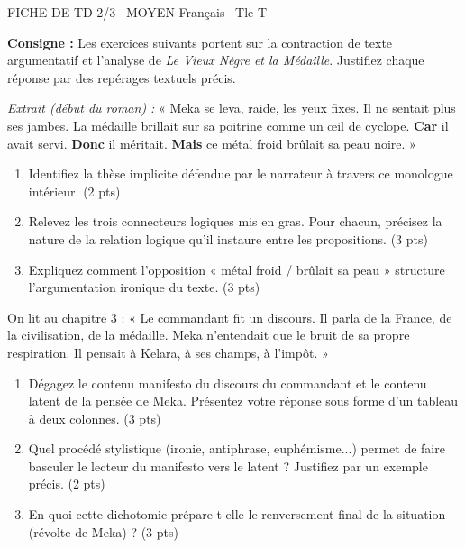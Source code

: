 \documentclass[11pt]{article}
\begin{document}
\begin{tcolorbox}[enhanced,colback=popink,colframe=popink,arc=10pt,boxrule=0pt,left=12pt,right=12pt,top=9pt,bottom=9pt]
{\color{white}\popxbold\small FICHE DE TD 2/3 \textbullet\ MOYEN \hfill Français \textbullet\ Tle T\par}
\end{tcolorbox}
\vspace{4pt}
\textbf{Consigne :} Les exercices suivants portent sur la contraction de texte argumentatif et l'analyse de \textit{Le Vieux Nègre et la Médaille}. Justifiez chaque réponse par des repérages textuels précis.

\begin{exercice}
\textit{Extrait (début du roman) :} « Meka se leva, raide, les yeux fixes. Il ne sentait plus ses jambes. La médaille brillait sur sa poitrine comme un œil de cyclope. \textbf{Car} il avait servi. \textbf{Donc} il méritait. \textbf{Mais} ce métal froid brûlait sa peau noire. »
\begin{enumerate}
    \item Identifiez la thèse implicite défendue par le narrateur à travers ce monologue intérieur. (2 pts)
    \item Relevez les trois connecteurs logiques mis en gras. Pour chacun, précisez la nature de la relation logique qu'il instaure entre les propositions. (3 pts)
    \item Expliquez comment l'opposition « métal froid / brûlait sa peau » structure l'argumentation ironique du texte. (3 pts)
\end{enumerate}
\end{exercice}

\begin{exercice}
On lit au chapitre 3 : « Le commandant fit un discours. Il parla de la France, de la civilisation, de la médaille. Meka n'entendait que le bruit de sa propre respiration. Il pensait à Kelara, à ses champs, à l'impôt. »
\begin{enumerate}
    \item Dégagez le contenu manifesto du discours du commandant et le contenu latent de la pensée de Meka. Présentez votre réponse sous forme d'un tableau à deux colonnes. (3 pts)
    \item Quel procédé stylistique (ironie, antiphrase, euphémisme...) permet de faire basculer le lecteur du manifesto vers le latent ? Justifiez par un exemple précis. (2 pts)
    \item En quoi cette dichotomie prépare-t-elle le renversement final de la situation (révolte de Meka) ? (3 pts)
\end{enumerate}
\end{exercice}
\end{document}
